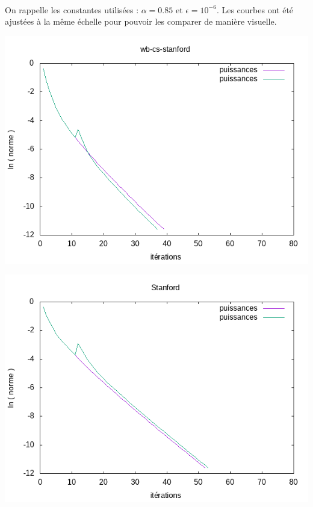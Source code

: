 		\paragraph{}On rappelle les constantes utilisées : $\alpha = 0.85$ et $\epsilon = 10^{-6}$. Les courbes ont été ajustées à la même échelle pour pouvoir les comparer de manière visuelle.\\
		
		\begin{minipage}[c]{.46\linewidth}
			\begin{center}
				\includegraphics[scale=0.5]{plot-wb-cs-stanford.png}
			\end{center}
		\end{minipage} \hfill
		\begin{minipage}[c]{.46\linewidth}
			\begin{center}
				\includegraphics[scale=0.5]{plot-Stanford.png}
			\end{center}
		\end{minipage}\\
